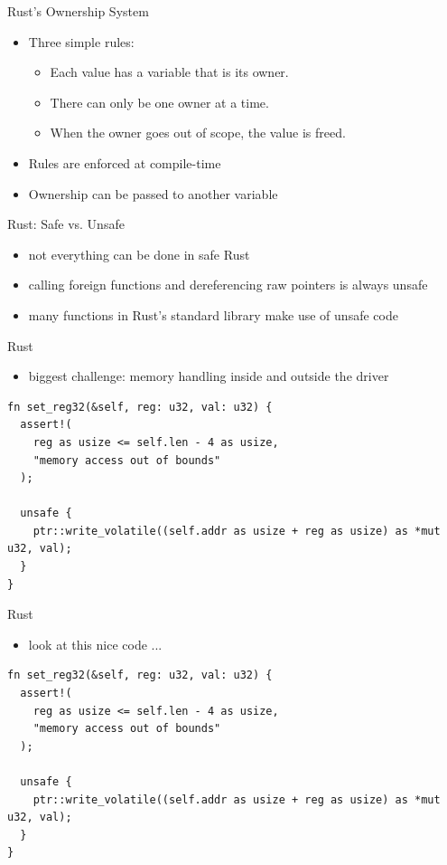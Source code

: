 \documentclass[NET,english,aspectratio=169,notitleframe,draft]{tumbeamer}
\begin{document}
\begin{frame}{Rust's Ownership System}
\begin{itemize}
\item Three simple rules:
\begin{itemize}
\item Each value has a variable that is its owner.
\item There can only be one owner at a time.
\item When the owner goes out of scope, the value is freed.
\end{itemize}
\item Rules are enforced at compile-time
\item Ownership can be passed to another variable%
\end{itemize}
\end{frame}

\begin{frame}{Rust: Safe vs. Unsafe}
\begin{itemize}
\item not everything can be done in safe Rust
\item calling foreign functions and dereferencing raw pointers is always unsafe
\item many functions in Rust's standard library make use of unsafe code
\end{itemize}
\end{frame}

\begin{frame}[fragile]{Rust}
\begin{itemize}
\item biggest challenge: memory handling inside and outside the driver
\end{itemize}
\begin{verbatim}
fn set_reg32(&self, reg: u32, val: u32) {
  assert!(
    reg as usize <= self.len - 4 as usize,
    "memory access out of bounds"
  );

  unsafe {
    ptr::write_volatile((self.addr as usize + reg as usize) as *mut u32, val);
  }
}
\end{verbatim}
\end{frame}

\begin{frame}[fragile]{Rust}
\begin{itemize}
\item look at this nice code ...
\end{itemize}
\begin{verbatim}
fn set_reg32(&self, reg: u32, val: u32) {
  assert!(
    reg as usize <= self.len - 4 as usize,
    "memory access out of bounds"
  );

  unsafe {
    ptr::write_volatile((self.addr as usize + reg as usize) as *mut u32, val);
  }
}
\end{verbatim}
\end{frame}
\end{document}
